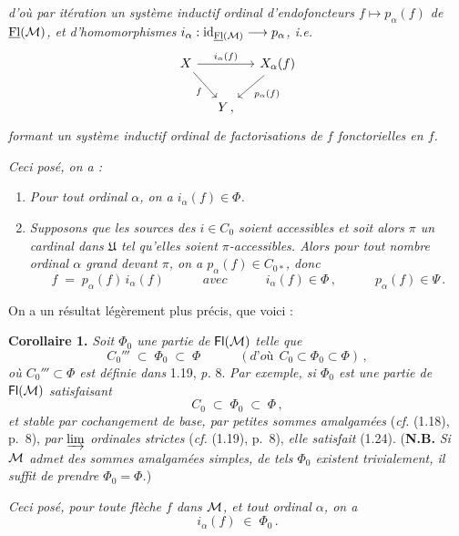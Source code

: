 
{\itshape d'où par itération un système inductif ordinal d'endofoncteurs $f\longmapsto p_\alpha(f)$ de $\underline{\mathrm{Fl}}(\mathcal{M})$, et d'homomorphismes $i_\alpha : \mathrm{id}_{\underline{\mathrm{Fl}}(\mathcal{M})} \longrightarrow p_\alpha$, \textup{i.e.}}
\[
\begin{tikzcd}[column sep=small]
X \arrow[rr, "i_\alpha(f)"] \arrow[dr, "f"'] & & X_\alpha(f) \arrow[dl, "p_\alpha(f)"] \\
& Y\,, &
\end{tikzcd}
\]
{\itshape formant un système inductif ordinal de factorisations de $f$ fonctorielles en $f$.}


{\itshape Ceci posé, on a :}
\begin{enumerate}[label={}, leftmargin=*]
\item[a)] {\itshape Pour tout ordinal $\alpha$, on a $i_\alpha(f)\in\Phi$.}
\item[b)] {\itshape Supposons que les sources des $i\in C_0$ soient accessibles et soit alors $\pi$ un cardinal dans $\mathfrak{U}$ tel qu'elles soient $\pi$-accessibles. Alors pour tout nombre ordinal $\alpha$ grand devant $\pi$, on a $p_\alpha(f)\in C_{0*}$, donc}
\[
f \;=\; p_\alpha(f)\, i_\alpha(f) \qquad\quad \textit{avec} \qquad\quad i_\alpha(f)\in\Phi\,, \qquad\quad p_\alpha(f)\in\Psi\,.
\]
\end{enumerate}

On a un résultat légèrement plus précis, que voici :

\textbf{Corollaire 1.} \textit{Soit $\Phi_0$ une partie de} $\mathsf{Fl}(\mathcal{M})$ \textit{telle que}
\[
C_0''' \;\subset\; \Phi_0 \;\subset\; \Phi \qquad\quad (\textit{d'où}\ \ C_0\subset\Phi_0\subset\Phi)\,,
\tag*{(1.24)}
\]
\textit{où $C_0'''\subset\Phi$ est définie dans} 1.19, \textit{p.} 8. \textit{Par exemple, si $\Phi_0$ est une partie de} $\mathsf{Fl}(\mathcal{M})$ \textit{satisfaisant}
\[
C_0 \;\subset\; \Phi_0 \;\subset\; \Phi\,,
\]
\textit{et stable par cochangement de base, par petites sommes amalgamées} (\textit{cf.} (1.18), p.~8), \textit{par $\varinjlim$ ordinales strictes} (\textit{cf.} (1.19), p.~8), \textit{elle satisfait} (1.24). (\textbf{N.B.} \textit{Si $\mathcal{M}$ admet des sommes amalgamées simples, de tels $\Phi_0$ existent trivialement, il suffit de prendre $\Phi_0=\Phi$.})


\textit{Ceci posé, pour toute flèche $f$ dans $\mathcal{M}$, et tout ordinal $\alpha$, on a}
\[
i_\alpha(f) \;\in\; \Phi_0\,.
\]


